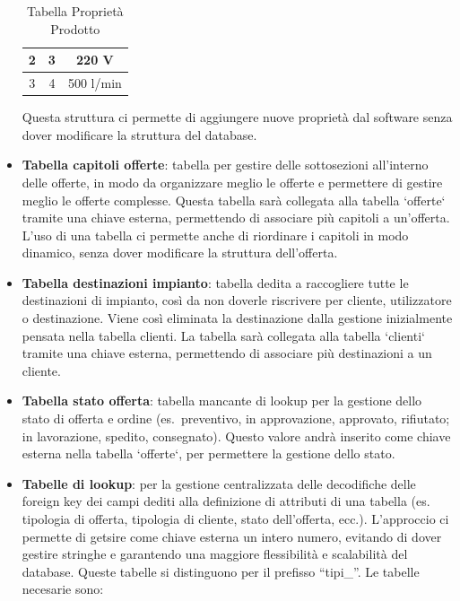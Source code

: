 \documentclass[12pt, a4paper]{article}
\begin{document}
\begin{itemize}
\begin{table}[H]
\begin{tabular}{|c|c|c|}
                  2                     & 3                            & 220 V                      \\ \hline
                  3                     & 4                            & 500 l/min                  \\ \hline
              \end{tabular}
              \vspace{0.5cm}
              \caption{Tabella Proprietà Prodotto}
              Questa struttura ci permette di aggiungere nuove proprietà dal software senza dover modificare la struttura del database.
          \end{table}
    \item \textbf{Tabella capitoli offerte}: tabella per gestire delle sottosezioni all'interno delle offerte, in modo da organizzare meglio le offerte e permettere di gestire meglio le offerte complesse.
          Questa tabella sarà collegata alla tabella `offerte` tramite una chiave esterna, permettendo di associare più capitoli a un'offerta.
          L'uso di una tabella ci permette anche di riordinare i capitoli in modo dinamico, senza dover modificare la struttura dell'offerta.
    \item \textbf{Tabella destinazioni impianto}: tabella dedita a raccogliere tutte le destinazioni di impianto, così da non doverle riscrivere per cliente, utilizzatore o destinazione. Viene così eliminata la destinazione dalla gestione inizialmente pensata nella tabella clienti.
          La tabella sarà collegata alla tabella `clienti` tramite una chiave esterna, permettendo di associare più destinazioni a un cliente.
    \item \textbf{Tabella stato offerta}: tabella mancante di lookup per la gestione dello stato di offerta e ordine (es.\ preventivo, in approvazione, approvato, rifiutato; in lavorazione, spedito, consegnato).
          Questo valore andrà inserito come chiave esterna nella tabella `offerte`, per permettere la gestione dello stato.
    \item \textbf{Tabelle di lookup}: per la gestione centralizzata delle decodifiche delle foreign key dei campi dediti alla definizione di attributi di una tabella (es. tipologia di offerta, tipologia di cliente, stato dell'offerta, ecc.).
          L'approccio ci permette di getsire come chiave esterna un intero numero, evitando di dover gestire stringhe e garantendo una maggiore flessibilità e scalabilità del database.
          Queste tabelle si distinguono per il prefisso ``tipi\_''.
          Le tabelle necesarie sono:

\end{itemize}
\end{document}
